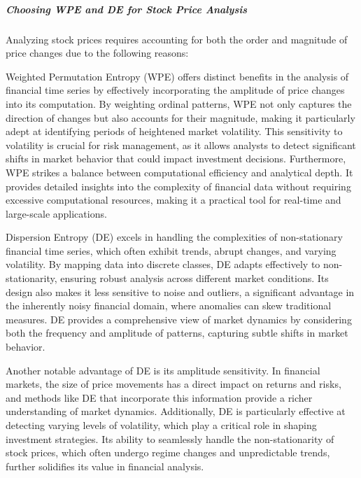 \subparagraph{Choosing WPE and DE for Stock Price Analysis}
Analyzing stock prices requires accounting for both the order and magnitude of price changes due to the following reasons:



Weighted Permutation Entropy (WPE) offers distinct benefits in the analysis of financial time series by effectively incorporating the amplitude of price changes into its computation. By weighting ordinal patterns, WPE not only captures the direction of changes but also accounts for their magnitude, making it particularly adept at identifying periods of heightened market volatility. This sensitivity to volatility is crucial for risk management, as it allows analysts to detect significant shifts in market behavior that could impact investment decisions. Furthermore, WPE strikes a balance between computational efficiency and analytical depth. It provides detailed insights into the complexity of financial data without requiring excessive computational resources, making it a practical tool for real-time and large-scale applications.



Dispersion Entropy (DE) excels in handling the complexities of non-stationary financial time series, which often exhibit trends, abrupt changes, and varying volatility. By mapping data into discrete classes, DE adapts effectively to non-stationarity, ensuring robust analysis across different market conditions. Its design also makes it less sensitive to noise and outliers, a significant advantage in the inherently noisy financial domain, where anomalies can skew traditional measures. DE provides a comprehensive view of market dynamics by considering both the frequency and amplitude of patterns, capturing subtle shifts in market behavior.

Another notable advantage of DE is its amplitude sensitivity. In financial markets, the size of price movements has a direct impact on returns and risks, and methods like DE that incorporate this information provide a richer understanding of market dynamics. Additionally, DE is particularly effective at detecting varying levels of volatility, which play a critical role in shaping investment strategies. Its ability to seamlessly handle the non-stationarity of stock prices, which often undergo regime changes and unpredictable trends, further solidifies its value in financial analysis.


